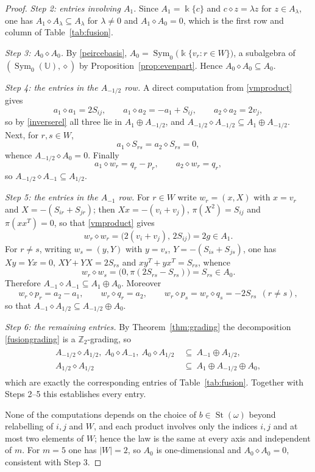 \documentclass[times,11pt,reqno]{amsproc}
\theoremstyle{definition}
\numberwithin{equation}{section}
\newcommand\fie{\Bbbk}
\def\ualg{\mathbb{U}}
\DeclareMathOperator{\St}{St}
\DeclareMathOperator{\Sym}{Sym}
\def\ualg{\mathbb{U}}
\begin{document}
\begin{proof}
\emph{Step 2: entries involving $A_1$.} Since $A_1=\fie\{c\}$ and
$c\diamond z=\lambda z$ for $z\in A_\lambda$, one has
$A_1\diamond A_\lambda\subseteq A_\lambda$ for $\lambda\neq0$ and
$A_1\diamond A_0=0$, which is the first row and column of
Table~\ref{tab:fusion}.

\emph{Step 3: $A_0\diamond A_0$.} By \eqref{peircebasis},
$A_0=\Sym_0\bigl(\fie\{v_r:r\in W\}\bigr)$, a subalgebra of
$(\Sym_0(\ualg),\diamond)$ by Proposition~\ref{prop:evenpart}. Hence
$A_0\diamond A_0\subseteq A_0$.

\emph{Step 4: the entries in the $A_{-1/2}$ row.} A direct computation
from \eqref{vmproduct} gives
$$
a_1\diamond a_1=2S_{ij},
\qquad
a_1\diamond a_2=-a_1+S_{ij},
\qquad
a_2\diamond a_2=2v_j ,
$$
so by \eqref{inverserel} all three lie in $A_1\oplus A_{-1/2}$, and
$A_{-1/2}\diamond A_{-1/2}\subseteq A_1\oplus A_{-1/2}$. Next, for
$r,s\in W$,
$$
a_1\diamond S_{rs}=a_2\diamond S_{rs}=0,
$$
whence $A_{-1/2}\diamond A_0=0$. Finally
$$
a_1\diamond w_r=q_r-p_r,
\qquad
a_2\diamond w_r=q_r ,
$$
so $A_{-1/2}\diamond A_{-1}\subseteq A_{1/2}$.

\emph{Step 5: the entries in the $A_{-1}$ row.} For $r\in W$ write
$w_r=(x,X)$ with $x=v_r$ and $X=-(S_{ir}+S_{jr})$; then $Xx=-(v_i+v_j)$,
$\pi(X^{2})=S_{ij}$ and $\pi(xx^{T})=0$, so that \eqref{vmproduct} gives
$$
w_r\diamond w_r=\bigl(2(v_i+v_j),\,2S_{ij}\bigr)=2g\in A_1 .
$$
For $r\neq s$, writing $w_s=(y,Y)$ with $y=v_s$,
$Y=-(S_{is}+S_{js})$, one has $Xy=Yx=0$, $XY+YX=2S_{rs}$ and
$xy^{T}+yx^{T}=S_{rs}$, whence
$$
w_r\diamond w_s=\bigl(0,\pi(2S_{rs}-S_{rs})\bigr)=S_{rs}\in A_0 .
$$
Therefore $A_{-1}\diamond A_{-1}\subseteq A_1\oplus A_0$. Moreover
$$
w_r\diamond p_r=a_2-a_1,
\qquad
w_r\diamond q_r=a_2,
\qquad
w_r\diamond p_s=w_r\diamond q_s=-2S_{rs}\ \ (r\neq s),
$$
so that $A_{-1}\diamond A_{1/2}\subseteq A_{-1/2}\oplus A_0$.

\emph{Step 6: the remaining entries.} By Theorem~\ref{thm:grading} the
decomposition \eqref{fusiongrading} is a $\mathbb Z_2$-grading, so
\begin{align}
\begin{aligned}
A_{-1/2}\diamond A_{1/2},
\
A_{0}\diamond A_{-1},
\
A_{0}\diamond A_{1/2}
\ &\subseteq\
A_{-1}\oplus A_{1/2},\\
A_{1/2}\diamond A_{1/2}
\ &\subseteq\
A_1\oplus A_{-1/2}\oplus A_0 ,
\end{aligned}
\end{align}
which are exactly the corresponding entries of Table~\ref{tab:fusion}.
Together with Steps 2--5 this establishes every entry.

None of the computations depends on the choice of $b\in\St(\omega)$
beyond relabelling of $i,j$ and $W$, and each product involves only the
indices $i,j$ and at most two elements of $W$; hence the law is the same
at every axis and independent of $m$. For $m=5$ one has $|W|=2$, so
$A_0$ is one-dimensional and $A_0\diamond A_0=0$, consistent with Step 3.
\end{proof}
\end{document}
